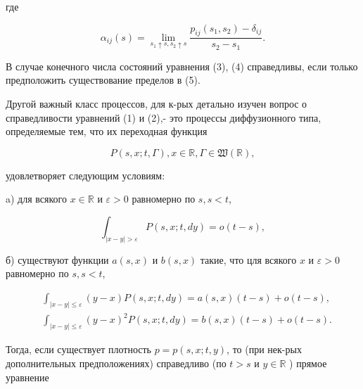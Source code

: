 \documentclass[10pt]{article}
\begin{document}
где



\[

\alpha_{i j}(s)=\lim _{s_{1} \uparrow s, s_{2} \uparrow s} \frac{p_{i j}\left(s_{1}, s_{2}\right)-\delta_{i j}}{s_{2}-s_{1}} .

\]



В случае конечного числа состояний уравнения (3), (4) справедливы, если только предположить существование пределов в (5).



Другой важный класс процессов, для к-рых детально изучен вопрос о справедливости уравнений (1) и (2),- это процессы диффузионного типа, определяемые тем, что их переходная функция



\[

P(s, x ; t, \Gamma), x \in \mathbb{R}, \Gamma \in \mathfrak{W}(\mathbb{R}),

\]



удовлетворяет следующим условиям:



a) для всякого $x \in \mathbb{R}$ и $\varepsilon>0$ равномерно по $s, s<t$,



\[

\int_{|x-y|>\varepsilon} P(s, x ; t, d y)=o(t-s),

\]



б) существуют функции $a(s, x)$ и $b(s, x)$ такие, что цля всякого $x$ и $\varepsilon>0$ равномерно по $s, s<t$,



\[

\begin{aligned}

& \int_{|x-y| \leqslant \varepsilon}(y-x) P(s, x ; t, d y)=a(s, x)(t-s)+o(t-s), \\

& \int_{|x-y| \leqslant \varepsilon}(y-x)^{2} P(s, x ; t, d y)=b(s, x)(t-s)+o(t-s) .

\end{aligned}

\]



Тогда, если существует плотность $p=p(s, x ; t, y)$, то (при нек-рых дополнительных предположениях) справедливо (по $t>s$ и $y \in \mathbb{R}$ ) прямое уравнение
\end{document}
